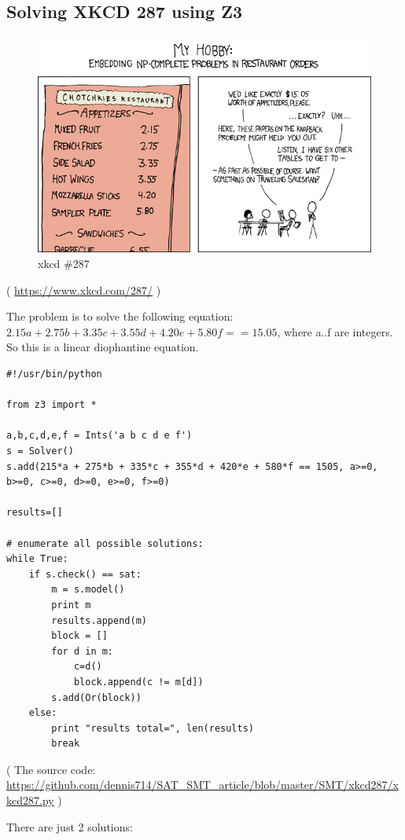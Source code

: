 \subsection{Solving XKCD 287 using Z3}

\begin{figure}[H]
\centering
\includegraphics[scale=7]{SMT/xkcd287/np_complete.png}
\caption{xkcd \#287}
\end{figure}

( \url{https://www.xkcd.com/287/} )

The problem is to solve the following equation:
$2.15a + 2.75b + 3.35c + 3.55d + 4.20e + 5.80f == 15.05$,
where a..f are integers.
So this is a linear diophantine equation.

\begin{lstlisting}
#!/usr/bin/python

from z3 import *

a,b,c,d,e,f = Ints('a b c d e f')
s = Solver()
s.add(215*a + 275*b + 335*c + 355*d + 420*e + 580*f == 1505, a>=0, b>=0, c>=0, d>=0, e>=0, f>=0)

results=[]

# enumerate all possible solutions:
while True:
    if s.check() == sat:
        m = s.model()
        print m
        results.append(m)
        block = []
        for d in m:
            c=d()
            block.append(c != m[d])
        s.add(Or(block))
    else:
        print "results total=", len(results)
        break
\end{lstlisting}

( The source code: \url{https://github.com/dennis714/SAT_SMT_article/blob/master/SMT/xkcd287/xkcd287.py} )

There are just 2 solutions:


